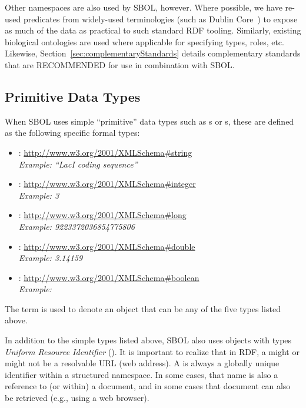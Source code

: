 Other namespaces are also used by SBOL, however.
Where possible, we have re-used predicates from widely-used terminologies (such as Dublin Core~\cite{dcmi2012}) to expose as much of the data as practical to such standard RDF tooling.
Similarly, existing biological ontologies are used where applicable for specifying types, roles, etc.
Likewise, Section~\ref{sec:complementaryStandards} details complementary standards that are RECOMMENDED for use in combination with SBOL.


\subsection{Primitive Data Types}
\label{sec:datatypes}
\label{sec:String}
\label{sec:Integer}
\label{sec:Long}
\label{sec:Double}
\label{sec:Boolean}
\label{sec:URI}
\label{sec:literal}

When SBOL uses simple ``primitive'' data types such as s or s, these are defined as the following specific formal types:
  \begin{itemize}
\item {}: \href{http://www.w3.org/2001/XMLSchema}{http://www.w3.org/2001/XMLSchema\#string}\\
  {\em Example: ``LacI coding sequence''}
\item {}: \href{http://www.w3.org/2001/XMLSchema}{http://www.w3.org/2001/XMLSchema\#integer}\\
  {\em Example: 3}
\item {}: \href{http://www.w3.org/2001/XMLSchema}{http://www.w3.org/2001/XMLSchema\#long}\\
  {\em Example: 9223372036854775806}
\item {}: \href{http://www.w3.org/2001/XMLSchema}{http://www.w3.org/2001/XMLSchema\#double}\\
  {\em Example: 3.14159}
\item {}: \href{http://www.w3.org/2001/XMLSchema}{http://www.w3.org/2001/XMLSchema\#boolean}\\
  {\em Example: }
\end{itemize}
The term  is used to denote an object that can be any of the five types listed above.

In addition to the simple types listed above, SBOL also uses objects with types \emph{Uniform Resource Identifier} (). It is important to realize that in RDF, a  might or might not be a resolvable URL (web address).  A  is always a globally unique identifier within a structured namespace.  In some cases, that name is also a reference to (or within) a document, and in some cases that document can also be retrieved (e.g., using a web browser).
